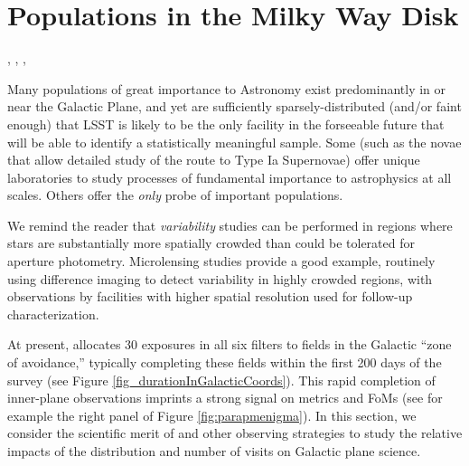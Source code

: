 %
%
%

\section{Populations in the Milky Way Disk}
\def\secname{MW_Disk}\label{sec:\secname}

, , , 

Many populations of great importance to Astronomy exist predominantly
in or near the Galactic Plane, and yet are sufficiently
sparsely-distributed (and/or faint enough) that LSST is likely to be
the only facility in the forseeable future that will be able to
identify a statistically meaningful sample. Some (such as the novae
that allow detailed study of the route to Type Ia Supernovae) offer
unique laboratories to study processes of fundamental importance to
astrophysics at all scales. Others \citep[like slow-microlensing events
  heralding an unseen compact object population; e.g.][]{2016MNRAS.458.3012W} offer the {\it only}
probe of important populations.

We remind the reader that {\it variability} studies can be performed
in regions where stars are substantially more spatially crowded than could be
tolerated for aperture photometry. Microlensing studies provide a good
example, routinely using difference imaging \citep[e.g.][]{1998ApJ...503..325A, 2010MNRAS.409..247K} to detect variability in highly crowded regions, with observations by
facilities with higher spatial resolution used for follow-up
characterization.


At present,  allocates 30
exposures in all six filters to fields in the Galactic ``zone of
avoidance,'' typically completing these fields within the first 200
days of the survey (see Figure
\ref{fig_durationInGalacticCoords}). This rapid completion of inner-plane observations imprints a strong signal on
metrics and FoMs (see for example the right panel of Figure
\ref{fig:parapmenigma}).  In this section, we consider the scientific merit of  and other observing strategies to study the relative impacts of the distribution and number of visits on Galactic plane science.

